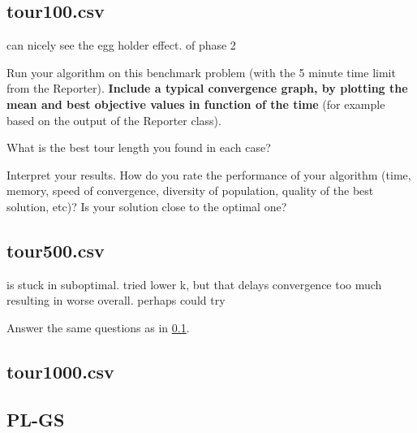 \documentclass[a4paper,10pt]{article}
\newcommand{\ReplaceMe}[1]{{\color{blue}#1}}
\begin{document}
\subsection{tour100.csv}\label{sec_shorttour}

can nicely see the egg holder effect. of phase 2

\ReplaceMe{Run your algorithm on this benchmark problem (with the 5 minute time limit from the Reporter). \textbf{Include a typical convergence graph, by plotting the mean and best objective values in function of the time} (for example based on the output of the Reporter class).

What is the best tour length you found in each case? 

Interpret your results. How do you rate the performance of your algorithm (time, memory, speed of convergence, diversity of population, quality of the best solution, etc)? Is your solution close to the optimal one?}

\subsection{tour500.csv}

is stuck in suboptimal. tried lower k, but that delays convergence too much resulting in worse overall.
perhaps could try 

\ReplaceMe{Answer the same questions as in \cref{sec_shorttour}.}



\subsection{tour1000.csv}


\subsection{PL-GS}
\end{document}
